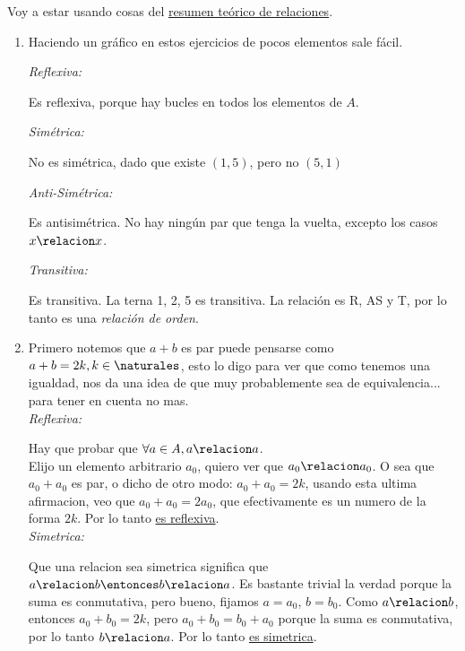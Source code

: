 Voy a estar usando cosas del \hyperlink{teoria-1:relaciones}{resumen teórico de relaciones}.

\begin{enumerate}[label=\roman*)]
  \item Haciendo un gráfico en estos ejercicios de pocos elementos sale fácil.\par

        \begin{minipage}{0.60\textwidth}
          \textit{Reflexiva:}\par
          Es reflexiva, porque hay bucles en todos los elementos de $A$.

          \textit{Simétrica:}\par
          No es simétrica, dado que existe $(1, 5)$, pero no $(5, 1)$

          \textit{Anti-Simétrica:}\par
          Es antisimétrica. No hay ningún par que tenga la vuelta, excepto los casos $x \relacion x$.

          \textit{Transitiva:}\par
          Es transitiva. La terna 1, 2, 5 es transitiva.
          La relación es R, AS y T, por lo tanto es una \textit{relación de orden}.
        \end{minipage}
        \begin{minipage}{0.3\textwidth}
          \quad  \veintidosi
        \end{minipage}

  \item Primero notemos que $a + b$ es par puede pensarse como $a + b = 2k, k \in \naturales$, esto lo digo
        para ver que como tenemos una igualdad, nos da una idea de que muy probablemente sea de equivalencia... para tener en cuenta no mas. \\
        \textit{Reflexiva:}\par 
        Hay que probar que $\forall a \in A, a \relacion a$. \\
        Elijo un elemento arbitrario $a_0$, quiero ver que $a_0 \relacion a_0$. O sea que $a_0 + a_0$ es par, o
        dicho de otro modo: $a_0 + a_0 = 2k$, usando esta ultima afirmacion, veo que $a_0 + a_0 = 2a_0$, que efectivamente
        es un numero de la forma $2k$. Por lo tanto \underline{es reflexiva}. \\
        
        \textit{Simetrica: }\par
        Que una relacion sea simetrica significa que $a \relacion b \entonces b \relacion a$. 
        Es bastante trivial la verdad porque la suma es conmutativa, pero bueno, fijamos $a = a_0$, $b = b_0$. 
        Como $a \relacion b$, entonces $a_0 + b_0 = 2k$, pero $a_0 + b_0 = b_0 + a_0$ porque la suma es conmutativa,
        por lo tanto $b \relacion a$. Por lo tanto \underline{es simetrica}. \\


\end{enumerate}
